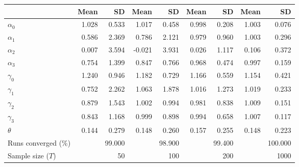 
\begin{tabular}[t]{lrrrrrrrr}
\toprule
  & Mean & SD & Mean  & SD  & Mean   & SD   & Mean    & SD   \\
\midrule
$\alpha_{0}$ & 1.028 & 0.533 & 1.017 & 0.458 & 0.998 & 0.208 & 1.003 & 0.076\\
$\alpha_{1}$ & 0.586 & 2.369 & 0.786 & 2.121 & 0.979 & 0.960 & 1.003 & 0.296\\
$\alpha_{2}$ & 0.007 & 3.594 & -0.021 & 3.931 & 0.026 & 1.117 & 0.106 & 0.372\\
$\alpha_{3}$ & 0.754 & 1.399 & 0.847 & 0.766 & 0.968 & 0.474 & 0.997 & 0.159\\
$\gamma_{0}$ & 1.240 & 0.946 & 1.182 & 0.729 & 1.166 & 0.559 & 1.154 & 0.421\\
$\gamma_{1}$ & 0.752 & 2.262 & 1.063 & 1.878 & 1.016 & 1.273 & 1.019 & 0.233\\
$\gamma_{2}$ & 0.879 & 1.543 & 1.002 & 0.994 & 0.981 & 0.838 & 1.009 & 0.151\\
$\gamma_{3}$ & 0.843 & 1.168 & 0.999 & 0.898 & 0.994 & 0.658 & 1.007 & 0.117\\
$\theta$ & 0.144 & 0.279 & 0.148 & 0.260 & 0.157 & 0.255 & 0.148 & 0.223\\
Runs converged (\%) &  & 99.000 &  & 98.900 &  & 99.400 &  & 100.000\\
Sample size ($T$) &  & 50 &  & 100 &  & 200 &  & 1000\\
\bottomrule
\end{tabular}
